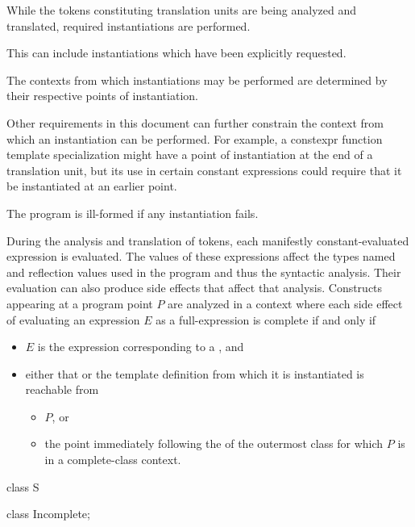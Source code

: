 \begin{enumerate}
While the tokens constituting translation units
are being analyzed and translated,
required instantiations are performed.
\begin{note}
This can include
instantiations which have been explicitly
requested.
\end{note}

The contexts from which instantiations may be performed
are determined by their respective points of instantiation.

\begin{note}
Other requirements in this document can further constrain
the context from which an instantiation can be performed.
For example, a constexpr function template specialization
might have a point of instantiation at the end of a translation unit,
but its use in certain constant expressions could require
that it be instantiated at an earlier point.
\end{note}

The program is ill-formed if any instantiation fails.

During the analysis and translation of tokens,
each manifestly constant-evaluated expression is evaluated.
The values of these expressions affect
the types named and reflection values used in the program and
thus the syntactic analysis.
Their evaluation can also produce side effects that affect that analysis.
Constructs appearing at a program point $P$ are analyzed
in a context where each side effect of evaluating an expression $E$
as a full-expression is complete if and only if
\begin{itemize}
\item
$E$ is the expression corresponding to
a , and
\item
either that  or
the template definition from which it is instantiated
is reachable from
\begin{itemize}
\item
$P$, or
\item
the point immediately following
the  of the outermost class
for which $P$ is in a complete-class context.
\end{itemize}
\end{itemize}
\begin{example}
\begin{codeblock}
class S {
  class Incomplete;

}
\end{codeblock}
\end{example}
\end{enumerate}
